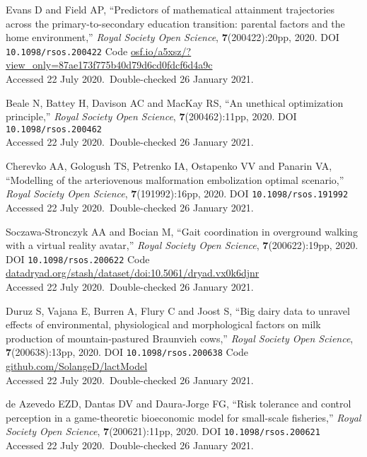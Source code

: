 \vbox{
Evans D and  Field AP, ``Predictors of mathematical attainment trajectories across the primary-to-secondary education transition: parental factors and the home environment,'' \emph{Royal Society Open Science}, \textbf{7}(200422):20pp, 2020. DOI \texttt{10.1098/rsos.200422} {Code \url{osf.io/a5xsz/?view_only=87ae173f775b40d79d6cd0fdcf6d4a9c}}\\\hfill{Accessed 22 July 2020.}\ {Double-checked 26 January 2021}.}\bibskip

\vbox{
Beale N,  Battey H,  Davison AC and  MacKay RS, ``An unethical optimization principle,'' \emph{Royal Society Open Science}, \textbf{7}(200462):11pp, 2020. DOI \texttt{10.1098/rsos.200462}\\\hfill{Accessed 22 July 2020.}\ {Double-checked 26 January 2021}.}\bibskip

\vbox{
Cherevko AA,  Gologush TS,  Petrenko IA,  Ostapenko VV and  Panarin VA, ``Modelling of the arteriovenous malformation embolization optimal scenario,'' \emph{Royal Society Open Science}, \textbf{7}(191992):16pp, 2020. DOI \texttt{10.1098/rsos.191992}\\\hfill{Accessed 22 July 2020.}\ {Double-checked 26 January 2021}.}\bibskip

\vbox{
Soczawa-Stronczyk AA and  Bocian M, ``Gait coordination in overground walking with a virtual reality avatar,'' \emph{Royal Society Open Science}, \textbf{7}(200622):19pp, 2020. DOI \texttt{10.1098/rsos.200622} {Code \url{datadryad.org/stash/dataset/doi:10.5061/dryad.vx0k6djnr}}\\\hfill{Accessed 22 July 2020.}\ {Double-checked 26 January 2021}.}\bibskip

\vbox{
Duruz S,  Vajana E,  Burren A,  Flury C and  Joost S, ``Big dairy data to unravel effects of environmental, physiological and morphological factors on milk production of mountain-pastured Braunvieh cows,'' \emph{Royal Society Open Science}, \textbf{7}(200638):13pp, 2020. DOI \texttt{10.1098/rsos.200638} {Code \url{github.com/SolangeD/lactModel}}\\\hfill{Accessed 22 July 2020.}\ {Double-checked 26 January 2021}.}\bibskip

\vbox{
de Azevedo EZD,  Dantas DV and  Daura-Jorge FG, ``Risk tolerance and control perception in a game-theoretic bioeconomic model for small-scale fisheries,'' \emph{Royal Society Open Science}, \textbf{7}(200621):11pp, 2020. DOI \texttt{10.1098/rsos.200621}\\\hfill{Accessed 22 July 2020.}\ {Double-checked 26 January 2021}.}\bibskip

